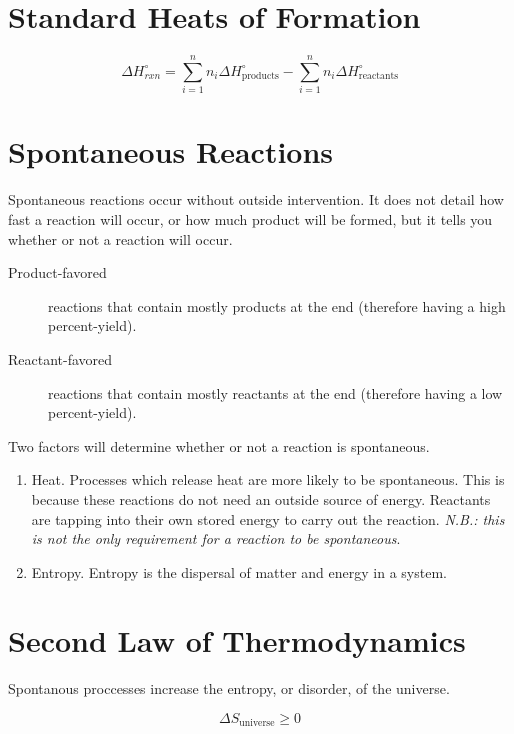 \section{Standard Heats of Formation}
\begin{equation}
  \Delta H^{\circ}_{rxn} = \sum_{i=1}^{n} n_i\Delta H^{\circ}_{\text{products}} -
  \sum_{i=1}^{n} n_i\Delta H^{\circ}_{\text{reactants}}
\end{equation}

\section{Spontaneous Reactions}
Spontaneous reactions occur without outside intervention. It does not detail how
fast a reaction will occur, or how much product will be formed, but it tells you
whether or not a reaction will occur.

\begin{description}
  \item[Product-favored] reactions that contain mostly products at the end
    (therefore having a high percent-yield).
  \item[Reactant-favored] reactions that contain mostly reactants at the end
    (therefore having a low percent-yield).
\end{description}

Two factors will determine whether or not a reaction is spontaneous.
\begin{enumerate}
  \item Heat. Processes which release heat are more likely to be spontaneous.
    This is because these reactions do not need an outside source of energy.
    Reactants are tapping into their own stored energy to carry out the
    reaction. \textit{N.B.: this is not the only requirement for a reaction to
    be spontaneous}.
  \item Entropy. Entropy is the dispersal of matter and energy in a system.
\end{enumerate}

\section{Second Law of Thermodynamics}
Spontanous proccesses increase the entropy, or disorder, of the universe.

\begin{equation}
\Delta S_{\text{universe}} \geq 0
\end{equation}

